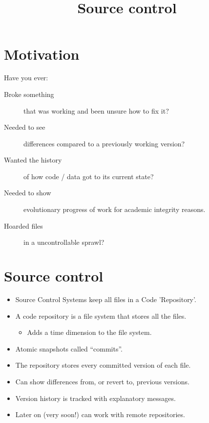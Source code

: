 \documentclass[slides]{pgnotes}
\title{Source control}
\begin{document}
\maketitle

\tableofcontents

\section{Motivation}

Have you ever:
\begin{description}
\item[Broke something] that was working and been unsure how to fix it?
\item[Needed to see] differences compared to a previously working version? 
\item[Wanted the history] of how code / data got to its current state?
\item[Needed to show] evolutionary progress of work for academic integrity reasons.
\item[Hoarded files] in a uncontrollable sprawl? 
\end{description}


\section{Source control}

\begin{itemize}
\item Source Control Systems keep all files in a Code 'Repository'.
\item A code repository is a file system that stores all the files.
  \begin{itemize}
  \item Adds a time dimension to the file system.
  \end{itemize}
\item Atomic snapshots called ``commits''.
\item The repository stores every committed version of each file.
\item Can show differences from, or revert to, previous versions.
\item Version history is tracked with explanatory messages.
\item Later on (very soon!) can work with remote repositories.
\end{itemize}
\end{document}
